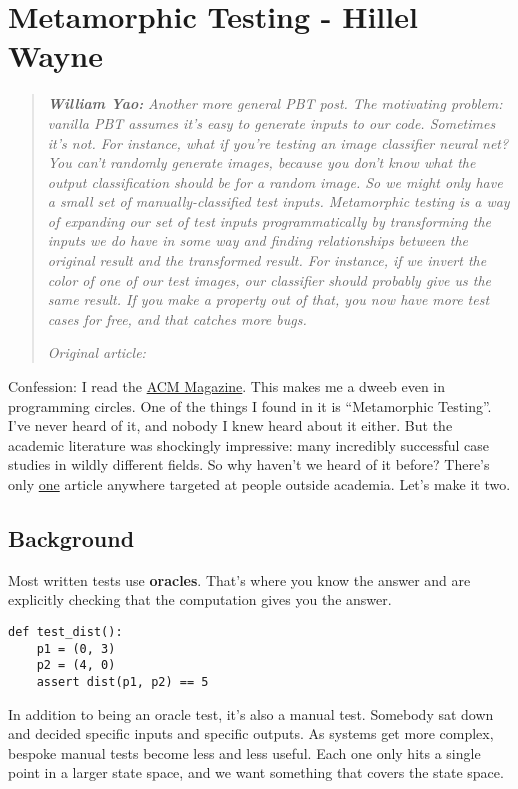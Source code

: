 \chapter{Metamorphic Testing - Hillel Wayne}


\begin{quotation}
\noindent\textit{\textbf{William Yao:}}
\textit{Another more general PBT post. The motivating problem: vanilla PBT assumes it's easy to generate inputs to our code. Sometimes it's not. For instance, what if you're testing an image classifier neural net? You can't randomly generate images, because you don't know what the output classification should be for a random image. So we might only have a small set of manually-classified test inputs. Metamorphic testing is a way of expanding our set of test inputs programmatically by transforming the inputs we do have in some way and finding relationships between the original result and the transformed result. For instance, if we invert the color of one of our test images, our classifier should probably give us the same result. If you make a property out of that, you now have more test cases for free, and that catches more bugs.}

\vspace{\baselineskip}
\noindent\textit{Original article: \cite{metamorphic_testing}}
\end{quotation}



\noindent Confession: I read the \href{https://queue.acm.org/}{ACM Magazine}. This
makes me a dweeb even in programming circles. One of the things I found
in it is ``Metamorphic Testing''. I've never heard of it, and nobody I
knew heard about it either. But the academic literature was shockingly
impressive: many incredibly successful case studies in wildly different
fields. So why haven't we heard of it before? There's only
\href{https://medium.com/trustableai/testing-ai-with-metamorphic-testing-61d690001f5c}{one}
article anywhere targeted at people outside academia. Let's make it two.

\section{Background}
\label{background}

Most written tests use \textbf{oracles}. That's where you know the
answer and are explicitly checking that the computation gives you the
answer.

\begin{verbatim}
def test_dist():
    p1 = (0, 3)
    p2 = (4, 0)
    assert dist(p1, p2) == 5
\end{verbatim}
In addition to being an oracle test, it's also a manual test. Somebody
sat down and decided specific inputs and specific outputs. As systems
get more complex, bespoke manual tests become less and less useful. Each
one only hits a single point in a larger state space, and we want
something that covers the state space.

